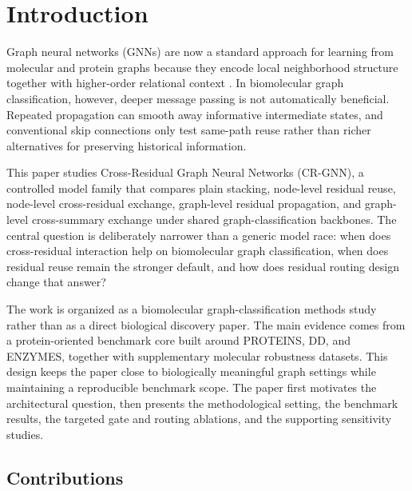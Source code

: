 \section*{Introduction}

Graph neural networks (GNNs) are now a standard approach for learning from molecular and protein graphs because they encode local neighborhood structure together with higher-order relational context \cite{kipf2016semi,gilmer2017neural,hamilton2017inductive}. In biomolecular graph classification, however, deeper message passing is not automatically beneficial. Repeated propagation can smooth away informative intermediate states, and conventional skip connections only test same-path reuse rather than richer alternatives for preserving historical information.

This paper studies Cross-Residual Graph Neural Networks (CR-GNN), a controlled model family that compares plain stacking, node-level residual reuse, node-level cross-residual exchange, graph-level residual propagation, and graph-level cross-summary exchange under shared graph-classification backbones. The central question is deliberately narrower than a generic model race: when does cross-residual interaction help on biomolecular graph classification, when does residual reuse remain the stronger default, and how does residual routing design change that answer?

The work is organized as a biomolecular graph-classification methods study rather than as a direct biological discovery paper. The main evidence comes from a protein-oriented benchmark core built around PROTEINS, DD, and ENZYMES, together with supplementary molecular robustness datasets. This design keeps the paper close to biologically meaningful graph settings while maintaining a reproducible benchmark scope. The paper first motivates the architectural question, then presents the methodological setting, the benchmark results, the targeted gate and routing ablations, and the supporting sensitivity studies.

\subsection*{Contributions}

